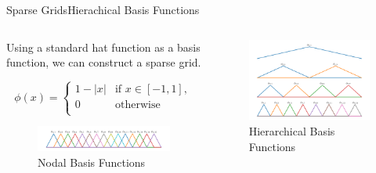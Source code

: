 \begin{frame}{Sparse Grids}{Hierachical Basis Functions}
    \begin{columns}
        \begin{column}{0.5\textwidth}
            Using a standard hat function as a basis function, we can construct a sparse grid.

            \begin{equation*}
                \phi(x ) = \left\{
                \begin{array}{ll}
                    1-|x| & \text{if } x \in [-1,1] , \\
                    0     & \text{otherwise}          \\
                \end{array}
                \right.
                \label{eqn:basis}
            \end{equation*}
            \begin{figure}
                \centering
                \includegraphics[width=\textwidth]{figures/nodal_basis.pdf}
                \caption{Nodal Basis Functions}
            \end{figure}
        \end{column}
        \begin{column}{0.5\textwidth}
            \begin{figure}
                \centering
                \includegraphics[width=\textwidth]{figures/hierarchical_basis.pdf}
                \caption{Hierarchical Basis Functions}
            \end{figure}
        \end{column}
    \end{columns}

\end{frame}


